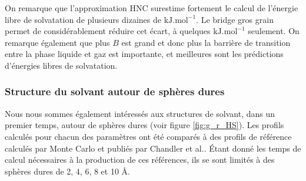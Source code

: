 On remarque que l'approximation HNC surestime fortement le calcul de l'énergie libre de solvatation de plusieurs dizaines de $\mathrm{kJ.mol}^{-1}$. Le bridge gros grain permet de considérablement réduire cet écart, à quelques $\mathrm{kJ.mol}^{-1}$ seulement.
On remarque également que plus $B$ est grand et donc plus la barrière de transition entre la phase liquide et gaz est importante, et meilleures sont les prédictions d'énergies libres de solvatation. 




\subsubsection{Structure du solvant autour de sphères dures}
Nous nous sommes également intéressés aux structures de solvant, dans un premier temps, autour de sphères dures (voir figure \ref{fig:g_r_HS}). Les profils calculés pour chacun des paramètres ont été comparés à des profils de référence calculés par Monte Carlo et publiés par Chandler et al.\cite{huang_hydrophobic_2002}. \'Etant donné les temps de calcul nécessaires à la production de ces références, ils se sont limités à des sphères dures de 2, 4, 6, 8 et 10 \AA.




